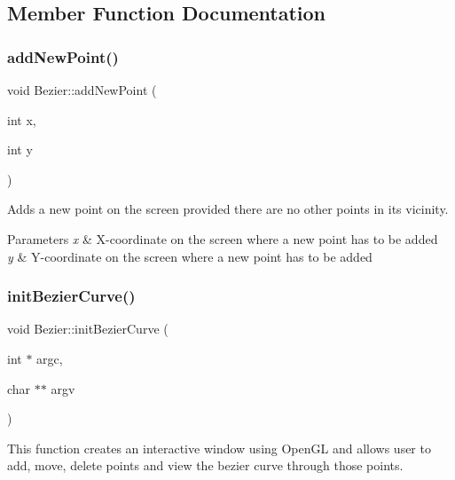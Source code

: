\subsection{Member Function Documentation}
\mbox{\label{class_bezier_ae7c0e0872d17a91d515db6c60fdb0449}} 
\subsubsection{\texorpdfstring{add\+New\+Point()}{addNewPoint()}}
{\footnotesize\ttfamily void Bezier\+::add\+New\+Point (\begin{DoxyParamCaption}\item[{int}]{x,  }\item[{int}]{y }\end{DoxyParamCaption})}



Adds a new point on the screen provided there are no other points in its vicinity. 


\begin{DoxyParams}{Parameters}
{\em x} & X-\/coordinate on the screen where a new point has to be added \\
\hline
{\em y} & Y-\/coordinate on the screen where a new point has to be added \\
\hline
\end{DoxyParams}
\mbox{\label{class_bezier_a3cdb8c9cf3ad2a4e48d7dfac8f98b71f}} 
\subsubsection{\texorpdfstring{init\+Bezier\+Curve()}{initBezierCurve()}}
{\footnotesize\ttfamily void Bezier\+::init\+Bezier\+Curve (\begin{DoxyParamCaption}\item[{int $\ast$}]{argc,  }\item[{char $\ast$$\ast$}]{argv }\end{DoxyParamCaption})\hspace{0.3cm}{\ttfamily [static]}}



This function creates an interactive window using Open\+GL and allows user to add, move, delete points and view the bezier curve through those points. 


